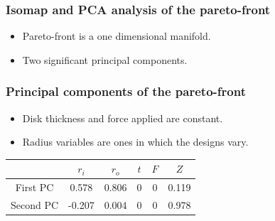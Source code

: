 \documentclass[svgnames, table, smaller]{beamer}
\begin{document}
\begin{frame}
  \frametitle{Isomap and PCA analysis of the pareto-front}

  \begin{itemize}
  \item Pareto-front is a one dimensional manifold.
  \item Two significant principal components.
  \end{itemize}

  \begin{figure}[ht]
    \begin{center}
      \label{clutchpareto}
    \end{center}
  \end{figure}


\end{frame}


\begin{frame}
  \frametitle{Principal components of the pareto-front}
  \begin{itemize}
    \item Disk thickness and force applied are constant.
    \item Radius variables are ones in which the designs vary. 
  \end{itemize}

  \begin{table}[!ht]
    \centering
    \begin{tabular}{c|c|c|c|c|c|}
      \cline{2-6}
      & $r_{i}$ & $r_{o}$ & $ t $  & $F$ & $Z$ \\
      \hline
      \multicolumn{1}{|c|}{First PC} & 0.578 & 0.806 & 0 & 0 & 0.119\\
      \hline
      \multicolumn{1}{|c|}{Second PC} & -0.207 & 0.004 & 0 & 0 & 0.978\\
      \hline
    \end{tabular}
    \label{first2clutchPCs}
  \end{table}
\end{frame}
\end{document}
